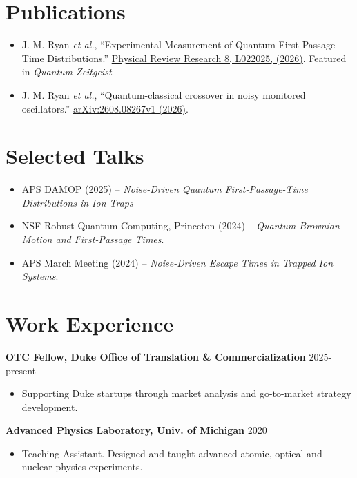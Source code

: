 \documentclass[10pt]{article}
\begin{document}
\section*{Publications}
\begin{itemize}
    \item J. M. Ryan \textit{et al.}, ``Experimental Measurement of Quantum First-Passage-Time Distributions.''  
    \href{https://journals.aps.org/prresearch/abstract/10.1103/p3pl-1m6n}{Physical Review Research 8, L022025, (2026)}. Featured in \textit{Quantum Zeitgeist}.
    \item J. M. Ryan \textit{et al.}, ``Quantum-classical crossover in noisy monitored oscillators.'' 
    \href{https://arxiv.org/abs/2608.08267}{arXiv:2608.08267v1 (2026)}.
\end{itemize}

\section*{Selected Talks}
\begin{itemize}
    \item APS DAMOP (2025) -- \textit{Noise-Driven Quantum First-Passage-Time Distributions in Ion Traps}
    \item NSF Robust Quantum Computing, Princeton (2024) -- \textit{Quantum Brownian Motion and First-Passage Times}.
    \item APS March Meeting (2024) -- \textit{Noise-Driven Escape Times in Trapped Ion Systems}.
\end{itemize}


\section*{Work Experience}
\noindent\textbf{OTC Fellow, Duke Office of Translation \& Commercialization} \hfill 2025-present
\begin{itemize}
    \item Supporting Duke startups through market analysis and go-to-market strategy development.
\end{itemize}

\noindent\textbf{Advanced Physics Laboratory, Univ. of Michigan} \hfill 2020
\begin{itemize}
    \item Teaching Assistant.  Designed and taught advanced atomic, optical and nuclear physics experiments.
\end{itemize}
\end{document}
